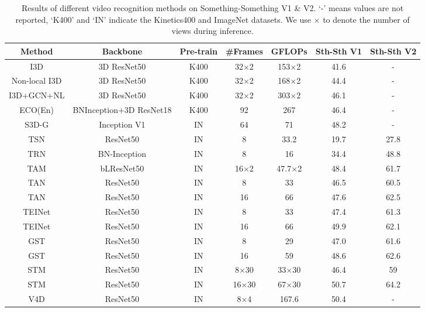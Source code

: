 \documentclass[journal]{IEEEtran}
\begin{document}
\begin{table*}[ht]
	\centering
	\caption{Results of different video recognition methods on Something-Something V1 \& V2. 
	`-' means values are not reported, `K400' and `IN' indicate the Kinetics400 and ImageNet datasets.
	We use $\times$ to denote the number of views during inference.}
	\label{tab:sth-sth}
	\begin{tabular}{c|c|c|c|c|c|c} \hline
		\textbf{Method} & \textbf{Backbone} & \textbf{Pre-train} & \textbf{\#Frames} & \textbf{GFLOPs} & \textbf{Sth-Sth V1} & \textbf{Sth-Sth V2} \\ \hline
		I3D \cite{carreira2017quo} & 3D ResNet50 & K400 & 32$\times$2 & 153$\times$2 & 41.6 & - \\
		Non-local I3D \cite{wang2018videos} & 3D ResNet50 & K400 & 32$\times$2 & 168$\times$2 & 44.4 & -\\
		I3D+GCN+NL \cite{wang2018videos} & 3D ResNet50 & K400 & 32$\times$2 & 303$\times$2 & 46.1 & - \\
		ECO(En) \cite{zolfaghari2018eco} & BNInception+3D ResNet18 & K400 & 92 & 267 & 46.4 & - \\ 
		S3D-G \cite{xie2018rethinking} & Inception V1 & IN & 64 & 71 & 48.2 & - \\ \hline
		TSN \cite{wang2016temporal} & ResNet50 & IN & 8 & 33.2 & 19.7 & 27.8 \\
		TRN \cite{zhou2018temporal} & BN-Inception & IN & 8 & 16 & 34.4 & 48.8 \\
		TAM \cite{fan2019more} & bLResNet50 & IN & 16$\times$2 & 47.7$\times$2 & 48.4 & 61.7 \\
		TAN \cite{liu2021tam} & ResNet50 & IN & 8 & 33 & 46.5 & 60.5 \\
		TAN \cite{liu2021tam} & ResNet50 & IN & 16 & 66 & 47.6 & 62.5 \\
		TEINet \cite{liu2020teinet} & ResNet50 & IN & 8 & 33 & 47.4 & 61.3 \\
		TEINet \cite{liu2020teinet} & ResNet50 & IN & 16 & 66 & 49.9 & 62.1 \\
GST \cite{luo2019grouped} & ResNet50 & IN & 8 & 29 & 47.0 & 61.6 \\
		GST \cite{luo2019grouped} & ResNet50 & IN & 16 & 59 & 48.6 & 62.6 \\
		STM \cite{jiang2019stm} & ResNet50 & IN & 8$\times$30 & 33$\times$30 & 46.4 & 59 \\
		STM \cite{jiang2019stm} & ResNet50 & IN & 16$\times$30 & 67$\times$30 & 50.7 & 64.2 \\
		V4D \cite{zhang2019v4d} & ResNet50 & IN & 8$\times$4 & 167.6 & 50.4 & - \\

\end{tabular}
\end{table*}
\end{document}

